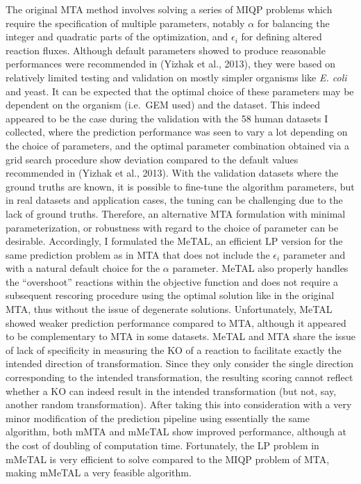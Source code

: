 \documentclass[12pt,twoside,openany,\mydriver]{thesis}  %
\begin{document}
The original MTA method involves solving a series of MIQP problems which require the specification of multiple parameters, notably \(\alpha\) for balancing the integer and quadratic parts of the optimization, and \(\epsilon_i\) for defining altered reaction fluxes. Although default parameters showed to produce reasonable performances were recommended in (Yizhak et al., 2013), they were based on relatively limited testing and validation on mostly simpler organisms like \emph{E. coli} and yeast. It can be expected that the optimal choice of these parameters may be dependent on the organism (i.e.~GEM used) and the dataset. This indeed appeared to be the case during the validation with the 58 human datasets I collected, where the prediction performance was seen to vary a lot depending on the choice of parameters, and the optimal parameter combination obtained via a grid search procedure show deviation compared to the default values recommended in (Yizhak et al., 2013). With the validation datasets where the ground truths are known, it is possible to fine-tune the algorithm parameters, but in real datasets and application cases, the tuning can be challenging due to the lack of ground truths. Therefore, an alternative MTA formulation with minimal parameterization, or robustness with regard to the choice of parameter can be desirable. Accordingly, I formulated the MeTAL, an efficient LP version for the same prediction problem as in MTA that does not include the \(\epsilon_i\) parameter and with a natural default choice for the \(\alpha\) parameter. MeTAL also properly handles the ``overshoot'' reactions within the objective function and does not require a subsequent rescoring procedure using the optimal solution like in the original MTA, thus without the issue of degenerate solutions. Unfortunately, MeTAL showed weaker prediction performance compared to MTA, although it appeared to be complementary to MTA in some datasets. MeTAL and MTA share the issue of lack of specificity in measuring the KO of a reaction to facilitate exactly the intended direction of transformation. Since they only consider the single direction corresponding to the intended transformation, the resulting scoring cannot reflect whether a KO can indeed result in the intended transformation (but not, say, another random transformation). After taking this into consideration with a very minor modification of the prediction pipeline using essentially the same algorithm, both mMTA and mMeTAL show improved performance, although at the cost of doubling of computation time. Fortunately, the LP problem in mMeTAL is very efficient to solve compared to the MIQP problem of MTA, making mMeTAL a very feasible algorithm.
\end{document}
